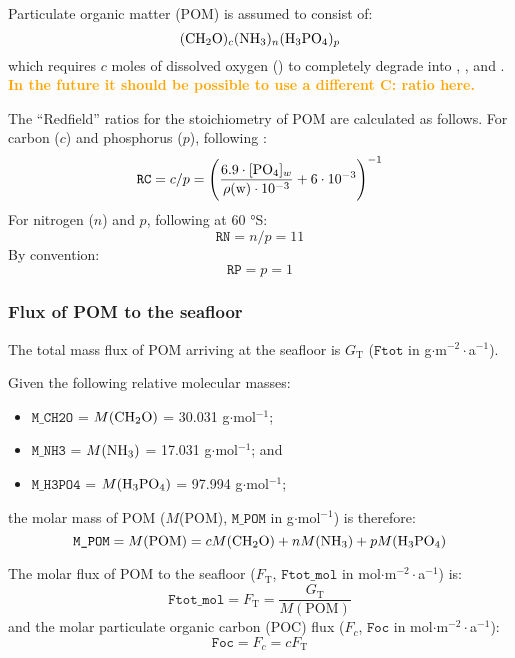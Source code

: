 \documentclass[a4paper]{article}
\newcommand{\code}[1]{\texttt{#1}}
\newcommand{\codenote}[1]{\textcolor{Orange}{\textbf{#1}}}
\begin{document}
Particulate organic matter (POM) is assumed to consist of:
\begin{equation}
(\ce{CH2O})_{c} (\ce{NH3})_{n} (\ce{H3PO4})_p
\end{equation}
which requires $c$ moles of dissolved oxygen () to completely degrade into , ,  and . \codenote{In the future it should be possible to use a different C:\ce{O2} ratio here.}

The ``Redfield'' ratios for the stoichiometry of POM are calculated as follows. For carbon ($c$) and phosphorus ($p$), following \citet{galbraith_simple_2015}:
\begin{equation}
\code{RC} = c/p = \Bigg( \frac{6.9 \cdot [\ce{PO4}]_w}{\rho(\mathrm{w}) \cdot 10^{-3}} + 6\cdot10^{-3} \Bigg)^{-1}
\end{equation}
For nitrogen ($n$) and $p$, following \citet{martiny_strong_2013} at 60 $\si{\degree}$S:
\begin{equation}
\code{RN} = n/p = 11
\end{equation}
By convention:
\begin{equation}
\code{RP} = p = 1
\end{equation}


\subsubsection{Flux of POM to the seafloor}

The total mass flux of POM arriving at the seafloor is $G_\mathrm{T}$ ($\code{Ftot}$ in g$\cdot$m$^{-2}\cdot$a$^{-1}$).

Given the following relative molecular masses:
\begin{itemize}
  \item $\code{M\_CH2O}$ = $M(\ce{CH2O})$ = 30.031 g$\cdot$mol$^{-1}$;
  \item $\code{M\_NH3}$ = $M(\ce{NH3})$ = 17.031 g$\cdot$mol$^{-1}$; and
  \item $\code{M\_H3PO4}$ = $M(\ce{H3PO4})$ = 97.994 g$\cdot$mol$^{-1}$;
\end{itemize}
the molar mass of POM ($M$(POM), $\code{M\_POM}$ in g$\cdot$mol$^{-1}$) is therefore:
\begin{equation}
\code{M\_POM} = M(\mathrm{POM}) = c M(\ce{CH2O}) + n M(\ce{NH3}) + p M(\ce{H3PO4})
\end{equation}

The molar flux of POM to the seafloor ($F_\mathrm{T}$, $\code{Ftot\_mol}$ in mol$\cdot$m$^{-2}\cdot$a$^{-1}$) is:
\begin{equation}
\code{Ftot\_mol} = F_\mathrm{T} = \frac{G_\mathrm{T}}{M(\mathrm{POM})}
\end{equation}
and the molar particulate organic carbon (POC) flux ($F_c$, $\code{Foc}$ in mol$\cdot$m$^{-2}\cdot$a$^{-1}$):
\begin{equation}
\code{Foc} = F_c = c F_\mathrm{T}
\end{equation}
\end{document}
